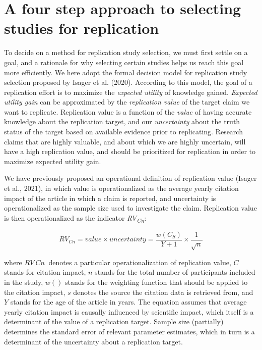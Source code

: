 \documentclass[
  man,floatsintext]{apa6}
\begin{document}
\hypertarget{a-four-step-approach-to-selecting-studies-for-replication}{%
\section{A four step approach to selecting studies for replication}\label{a-four-step-approach-to-selecting-studies-for-replication}}

To decide on a method for replication study selection, we must first settle on a goal, and a rationale for why selecting certain studies helps us reach this goal more efficiently. We here adopt the formal decision model for replication study selection proposed by Isager et al. (2020). According to this model, the goal of a replication effort is to maximize the \emph{expected utility} of knowledge gained. \emph{Expected utility gain} can be approximated by the \emph{replication value} of the target claim we want to replicate. Replication value is a function of the \emph{value} of having accurate knowledge about the replication target, and our \emph{uncertainty} about the truth status of the target based on available evidence prior to replicating. Research claims that are highly valuable, and about which we are highly uncertain, will have a high replication value, and should be prioritized for replication in order to maximize expected utility gain.

We have previously proposed an operational definition of replication value (Isager et al., 2021), in which value is operationalized as the average yearly citation impact of the article in which a claim is reported, and uncertainty is operationalized as the sample size used to investigate the claim. Replication value is then operationalized as the indicator \emph{RV\textsubscript{Cn}}:

\begin{equation} 
  \tag{1}
  RV_{Cn} = value\times uncertainty = \frac{w(C_{S})}{Y+1}\times\frac{1}{\sqrt{n}}
  \label{eq:1}
\end{equation}

where \(RV~Cn~\) denotes a particular operationalization of replication value, \(C\) stands for citation impact, \(n\) stands for the total number of participants included in the study, \(w()\) stands for the weighting function that should be applied to the citation impact, \(s\) denotes the source the citation data is retrieved from, and \(Y\) stands for the age of the article in years. The equation assumes that average yearly citation impact is causally influenced by scientific impact, which itself is a determinant of the value of a replication target. Sample size (partially) determines the standard error of relevant parameter estimates, which in turn is a determinant of the uncertainty about a replication target.
\end{document}
